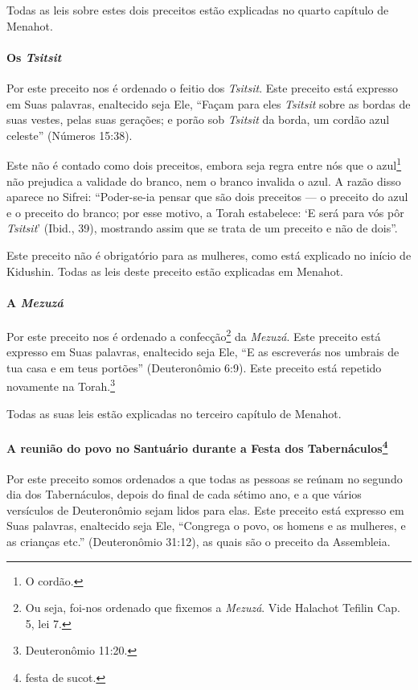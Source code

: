 Todas as leis sobre estes dois preceitos estão explicadas no quarto
capítulo de Menahot.

\paragraph{Os \textit{Tsitsit}}

Por este preceito nos é ordenado o feitio dos \textit{Tsitsit}. Este
preceito está expresso em Suas palavras, enaltecido seja Ele, ``Façam
para eles \textit{Tsitsit} sobre as bordas de suas vestes, pelas suas gerações;
e porão sob \textit{Tsitsit} da borda, um cordão azul celeste'' (Números
15:38).

Este não é contado como dois preceitos, embora seja regra entre nós que
o azul\footnote{O cordão.} não prejudica a validade do
branco, nem o branco invalida
o azul. A razão disso aparece no Sifrei:
``Poder-se-ia pensar que são dois preceitos --- o preceito do azul e o
preceito do branco; por esse motivo, a Torah estabelece: `E será para
vós pôr \textit{Tsitsit}' (Ibid., 39), mostrando assim que se trata de um
preceito e não de dois''.

Este preceito não é obrigatório para as mulheres, como está explicado no
início de Kidushin. Todas as leis deste preceito estão explicadas em
Menahot.

\paragraph{A \textit{Mezuzá}}

Por este preceito nos é ordenado a confecção\footnote{Ou seja, foi-nos ordenado que fixemos a \textit{Mezuzá}. Vide Halachot Tefilin Cap. 5, lei 7.} da
\textit{Mezuzá}. Este
preceito está expresso em Suas palavras, enaltecido seja Ele, ``E as
escreverás
nos umbrais de tua casa e em teus portões'' (Deuteronômio 6:9). Este
preceito está repetido novamente na Torah.\footnote{Deuteronômio 11:20.}

Todas as suas leis estão explicadas no terceiro capítulo de Menahot.

\paragraph{A reunião do povo no Santuário durante a Festa dos
Tabernáculos\protect\footnote{festa de sucot.}}

Por este preceito somos ordenados a que todas as pessoas se reúnam no
segundo dia dos Tabernáculos, depois do final de cada sétimo ano, e a
que vários versículos de Deuteronômio sejam lidos para elas. Este
preceito está expresso em Suas palavras, enaltecido seja Ele, ``Congrega
o povo, os homens e as mulheres, e as crianças etc.'' (Deuteronômio
31:12), as quais são o preceito da Assembleia.

